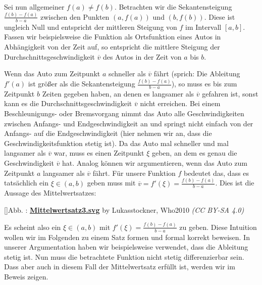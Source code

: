 \documentclass[fontsize=9pt,
               parskip=half-,
               DIV=14,
               listof=chapterentry,
               tocflat]{scrbook}
\newcounter{imagelabel}
\begin{document}
Sei nun allgemeiner $f(a)\neq f(b)$. Betrachten wir die Sekantensteigung ${\tfrac {f(b)-f(a)}{b-a}}$ zwischen den Punkten $(a,f(a))$ und $(b,f(b))$. Diese ist ungleich Null und entspricht der mittleren Steigung von $f$ im Intervall $[a,b]$. Fassen wir beispielsweise die Funktion als Ortsfunktion eines Autos in Abhängigkeit von der Zeit auf, so entspricht die mittlere Steigung der Durchschnittsgeschwindigkeit ${\overline {v}}$ des Autos in der Zeit von $a$ bis $b$.

Wenn das Auto zum Zeitpunkt $a$ schneller als ${\overline {v}}$ fährt (sprich: Die Ableitung $f'(a)$ ist größer als die Sekantensteigung ${\tfrac {f(b)-f(a)}{b-a}}$), so muss es bis zum Zeitpunkt $b$ Zeiten gegeben haben, an denen es langsamer als ${\overline {v}}$ gefahren ist, sonst kann es die Durchschnittsgeschwindigkeit ${\overline {v}}$ nicht erreichen. Bei einem Beschleunigungs- oder Bremsvorgang nimmt das Auto alle Geschwindigkeiten zwischen Anfangs- und Endgeschwindigkeit an und springt nicht einfach von der Anfangs- auf die Endgeschwindigkeit (hier nehmen wir an, dass die Geschwindigkeitsfunktion stetig ist). Da das Auto mal schneller und mal langsamer als ${\overline {v}}$ war, muss es einen Zeitpunkt $\xi $ geben, an dem es genau die Geschwindigkeit ${\overline {v}}$ hat. Analog können wir argumentieren, wenn das Auto zum Zeitpunkt $a$ langsamer als ${\overline {v}}$ fährt. Für unsere Funktion $f$ bedeutet das, dass es tatsächlich ein $\xi \in (a,b)$ geben muss mit ${\overline {v}}=f'(\xi )={\tfrac {f(b)-f(a)}{b-a}}$. Dies ist die Aussage des Mittelwertsatzes:

[]{Abb. : \protect\href{https://commons.wikimedia.org/wiki/File:Mittelwertsatz3.svg}{\textbf{Mittelwertsatz3.svg}} by Lukasstockner, Who2010 \textit{(CC BY-SA 4.0)}}\begin{center}
\end{center}

Es scheint also ein $\xi \in (a,b)$ mit $f'(\xi )={\tfrac {f(b)-f(a)}{b-a}}$ zu geben. Diese Intuition wollen wir im Folgenden zu einem Satz formen und formal korrekt beweisen. In unserer Argumentation haben wir beispielsweise verwendet, dass die Ableitung stetig ist. Nun muss die betrachtete Funktion nicht stetig differenzierbar sein. Dass aber auch in diesem Fall der Mittelwertsatz erfüllt ist, werden wir im Beweis zeigen.
\end{document}
